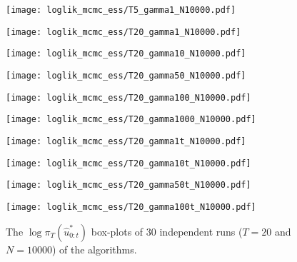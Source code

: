 \begin{figure}[!thbp]
    \centering
    \begin{minipage}{.5\textwidth}
        \centering
        \texttt{[image: loglik\_mcmc\_ess/T5\_gamma1\_N10000.pdf]}
      
    \end{minipage}%
    \begin{minipage}{0.5\textwidth}
        \centering
        \texttt{[image: loglik\_mcmc\_ess/T20\_gamma1\_N10000.pdf]}
      
    \end{minipage}
    \begin{minipage}{0.5\textwidth}
        \centering
        \texttt{[image: loglik\_mcmc\_ess/T20\_gamma10\_N10000.pdf]}
      
    \end{minipage}%
    \begin{minipage}{0.5\textwidth}
        \centering
        \texttt{[image: loglik\_mcmc\_ess/T20\_gamma50\_N10000.pdf]}
      
    \end{minipage}
    \begin{minipage}{0.5\textwidth}
        \centering
        \texttt{[image: loglik\_mcmc\_ess/T20\_gamma100\_N10000.pdf]}
      
    \end{minipage}%
    \begin{minipage}{0.5\textwidth}
        \centering
        \texttt{[image: loglik\_mcmc\_ess/T20\_gamma1000\_N10000.pdf]}
      
    \end{minipage}
    \begin{minipage}{0.5\textwidth}
        \centering
        \texttt{[image: loglik\_mcmc\_ess/T20\_gamma1t\_N10000.pdf]}
      
    \end{minipage}%
    \begin{minipage}{0.5\textwidth}
        \centering
        \texttt{[image: loglik\_mcmc\_ess/T20\_gamma10t\_N10000.pdf]}
      
    \end{minipage}
    \begin{minipage}{0.5\textwidth}
        \centering
        \texttt{[image: loglik\_mcmc\_ess/T20\_gamma50t\_N10000.pdf]}
      
    \end{minipage}%
    \begin{minipage}{0.5\textwidth}
        \centering
        \texttt{[image: loglik\_mcmc\_ess/T20\_gamma100t\_N10000.pdf]}
    \end{minipage}
    \caption{The $\log\pi_T(\hat{u}^*_{0:t})$ box-plots of 30 independent runs ($T=20$ and $N=10000$) of the algorithms.}
    \label{fig:ess}
\end{figure}

